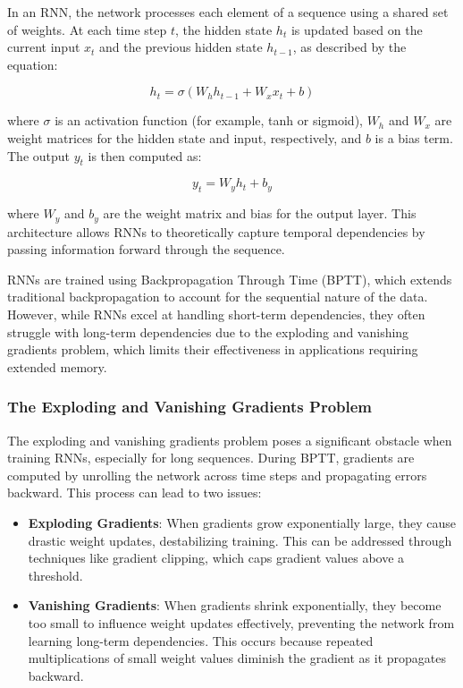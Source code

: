 \documentclass[10pt,a4paper]{article}
\begin{document}
In an RNN, the network processes each element of a sequence using a shared set of weights. At each time step \( t \), the hidden state \( h_t \) is updated based on the current input \( x_t \) and the previous hidden state \( h_{t-1} \), as described by the equation:

\[ h_t = \sigma(W_h h_{t-1} + W_x x_t + b) \]

where \( \sigma \) is an activation function (for example, tanh or sigmoid), \( W_h \) and \( W_x \) are weight matrices for the hidden state and input, respectively, and \( b \) is a bias term. The output \( y_t \) is then computed as:

\[ y_t = W_y h_t + b_y \]

where \( W_y \) and \( b_y \) are the weight matrix and bias for the output layer. This architecture allows RNNs to theoretically capture temporal dependencies by passing information forward through the sequence.

RNNs are trained using Backpropagation Through Time (BPTT), which extends traditional backpropagation to account for the sequential nature of the data. However, while RNNs excel at handling short-term dependencies, they often struggle with long-term dependencies due to the exploding and vanishing gradients problem, which limits their effectiveness in applications requiring extended memory.

\subsubsection{The Exploding and Vanishing Gradients Problem}

The exploding and vanishing gradients problem poses a significant obstacle when training RNNs, especially for long sequences. During BPTT, gradients are computed by unrolling the network across time steps and propagating errors backward. This process can lead to two issues:

\begin{itemize}
    \item \textbf{Exploding Gradients}: When gradients grow exponentially large, they cause drastic weight updates, destabilizing training. This can be addressed through techniques like gradient clipping, which caps gradient values above a threshold.
    \item \textbf{Vanishing Gradients}: When gradients shrink exponentially, they become too small to influence weight updates effectively, preventing the network from learning long-term dependencies. This occurs because repeated multiplications of small weight values diminish the gradient as it propagates backward.
\end{itemize}
\end{document}
